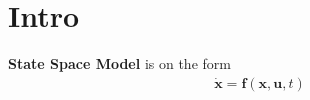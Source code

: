\section{Intro}

\textbf{State Space Model} is on the form
\begin{align*}
    \dot{\bm{x}} = \bm{f}(\bm{x},\bm{u},t)
\end{align*}